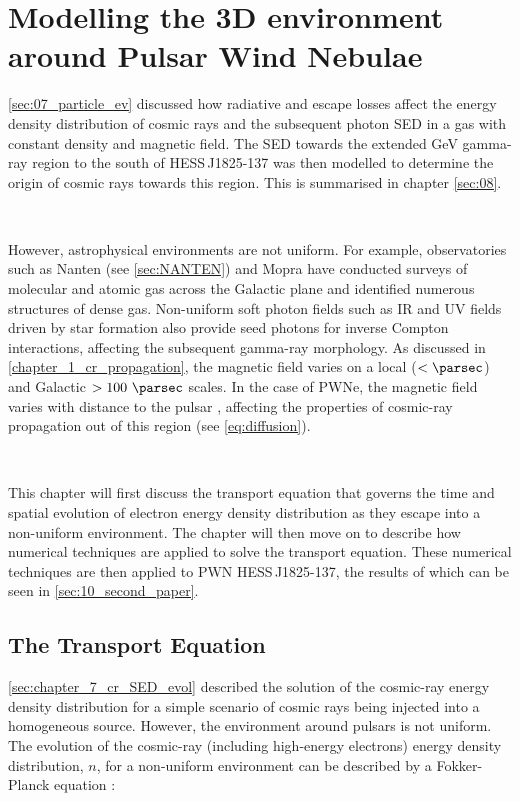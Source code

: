 \chapter{Modelling the 3D environment around Pulsar Wind Nebulae} \label{sec:09_multizone}

\autoref{sec:07_particle_ev} discussed how radiative and escape losses affect the energy density distribution of cosmic rays and the subsequent photon SED in a gas with constant density and magnetic field. The SED towards the extended GeV gamma-ray region to the south of \mbox{HESS\,J1825-137} was then modelled to determine the origin of cosmic rays towards this region. This is summarised in chapter \autoref{sec:08}.
\par~\par
However, astrophysical environments are not uniform. For example, observatories such as Nanten (see \autoref{sec:NANTEN}) and Mopra \citep{2018PASA...35...29B} have conducted surveys of molecular and atomic gas across the Galactic plane and identified numerous structures of dense gas. Non-uniform soft photon fields such as IR and UV fields driven by star formation also provide seed photons for inverse Compton interactions, affecting the subsequent gamma-ray morphology. As discussed in \autoref{chapter_1_cr_propagation}, the magnetic field varies on a local ($<\pc$) and Galactic $>100~\pc$ scales. In the case of PWNe, the magnetic field varies with distance to the pulsar \citep{2012SSRv..166..231R}, affecting the properties of cosmic-ray propagation out of this region (see \autoref{eq:diffusion}).
\par~\par
This chapter will first discuss the transport equation that governs the time and spatial evolution of electron energy density distribution as they escape into a non-uniform environment. The chapter will then move on to describe how numerical techniques are applied to solve the transport equation. These numerical techniques are then applied to PWN \mbox{HESS\,J1825-137}, the results of which can be seen in \autoref{sec:10_second_paper}.

\section{The Transport Equation} \label{sec:09_Transport_multizone_diffusion}

\autoref{sec:chapter_7_cr_SED_evol} described the solution of the cosmic-ray energy density distribution for a simple scenario of cosmic rays being injected into a homogeneous source. However, the environment around pulsars is not uniform. The evolution of the cosmic-ray (including high-energy electrons) energy density distribution, $n$, for a non-uniform environment can be described by a Fokker-Planck equation \citep{1975MNRAS.172..557S,1978A&A....70..367C}:

